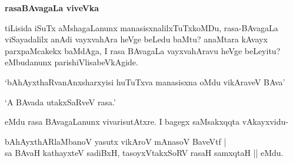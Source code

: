 
{\bigskip
\noindent
{\large\bf rasaBAvagaLa viveVka}}\label{page224}
\medskip

\noindent
tiLisida iSuTx aMshagaLanunx manasisxnalilxTuTxkoMDu, rasa-BAvagaLa viSayadalilx anAdi vayxvahAra heVge beLedu baMtu? anaMtara kAvayx parxpaMcakekx baMdAga, I rasa BAvagaLa vayxvahAravu heVge beLeyitu? eMbudanunx parishiVlisabeVkAgide.

`bAhAyxthaRvanAnxsharxyisi huTuTxva manasisxna oMdu vikAraveV BAva'

`A BAvada utakxSaRveV rasa.'

eMdu rasa BAvagaLanunx vivarisutAtxre. I bagegx saMsakxqqta vAkayxvidu-

\begin{shloka}
bAhAyxthARlaMbanoV yasutx vikAroV mAnasoV BaveVtf |\\\label{225}
sa BAvaH kathayxteV sadiBxH, tasoyxVtakxSoRV rasaH samxqtaH || eMdu.
\end{shloka}

